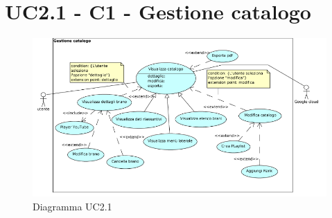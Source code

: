 \section{UC2.1 - C1 - Gestione catalogo}
\begin{figure}[h]
  \centering
  \includegraphics[width=18cm]{img/AR/UC2_1.png}
\caption{Diagramma UC2.1}
\end{figure}

